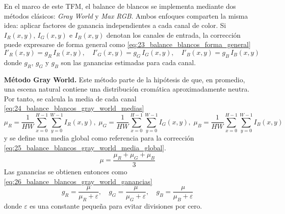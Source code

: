 En el marco de este TFM, el balance de blancos se implementa mediante dos métodos clásicos:
\textit{Gray World} y \textit{Max RGB}. Ambos enfoques comparten la misma idea: aplicar
factores de ganancia independientes a cada canal de color. Si $I_R(x,y)$, $I_G(x,y)$ e $I_B(x,y)$
denotan los canales de entrada, la corrección puede expresarse de forma general como \eqref{eq:23_balance_blancos_forma_general}
\begin{equation}
    I'_{R}(x,y)=g_R\,I_R(x,y), \quad I'_{G}(x,y)=g_G\,I_G(x,y), \quad I'_{B}(x,y)=g_B\,I_B(x,y)
    \label{eq:23_balance_blancos_forma_general}
\end{equation}
donde $g_R$, $g_G$ y $g_B$ son las ganancias estimadas para cada canal.

\textbf{Método Gray World.} Este método parte de la hipótesis de que, en promedio, una escena
natural contiene una distribución cromática aproximadamente neutra. Por tanto, se calcula la media
de cada canal \eqref{eq:24_balance_blancos_gray_world_medias}
\begin{equation}
    \mu_R = \frac{1}{HW}\sum_{x=0}^{H-1}\sum_{y=0}^{W-1} I_R(x,y), \;
    \mu_G = \frac{1}{HW}\sum_{x=0}^{H-1}\sum_{y=0}^{W-1} I_G(x,y), \;
    \mu_B = \frac{1}{HW}\sum_{x=0}^{H-1}\sum_{y=0}^{W-1} I_B(x,y)
    \label{eq:24_balance_blancos_gray_world_medias}
\end{equation}
y se define una media global como referencia para la corrección \eqref{eq:25_balance_blancos_gray_world_media_global}.
\begin{equation}
    \mu = \frac{\mu_R + \mu_G + \mu_B}{3}
    \label{eq:25_balance_blancos_gray_world_media_global}
\end{equation}
Las ganancias se obtienen entonces como \eqref{eq:26_balance_blancos_gray_world_ganancias}
\begin{equation}
    g_R = \frac{\mu}{\mu_R + \varepsilon}, \quad g_G = \frac{\mu}{\mu_G + \varepsilon}, \quad g_B = \frac{\mu}{\mu_B + \varepsilon}
    \label{eq:26_balance_blancos_gray_world_ganancias}
\end{equation}
donde $\varepsilon$ es una constante pequeña para evitar divisiones por cero.


